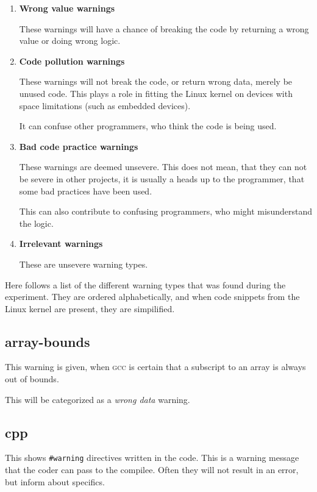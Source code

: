 \documentclass[a4paper,11pt]{report}
\newcommand{\textcode}[1]{\fboxsep=1pt\texttt{\colorbox{gray!20}{#1}}}
\newcommand{\figa}{
    \begin{figure}[!htpb]
    \centering
}
\newcommand{\figb}[2]{
    \caption{#1}
    \label{#2}
    \end{figure}
}
\begin{document}
\begin{enumerate}
    \item \textbf{Wrong value warnings}

These warnings will have a chance of breaking the code by returning a wrong
value or doing wrong logic.

    \item \textbf{Code pollution warnings}

These warnings will not break the code, or return wrong data, merely be 
unused code. This plays a role in fitting the Linux kernel on devices with 
space limitations (such as embedded devices).

It can confuse other programmers, who think the code is being used.

    \item \textbf{Bad code practice warnings}

These warnings are deemed unsevere. This does not mean, that they can not be 
severe in other projects, it is usually a heads up to the programmer, that some 
bad practices have been used.

This can also contribute to confusing programmers, who might misunderstand the 
logic.


    \item \textbf{Irrelevant warnings}

These are unsevere warning types.

\end{enumerate}


Here follows a list of the different warning types that was found during the 
experiment.  They are ordered alphabetically, and when code snippets from the 
Linux kernel are present, they are simpilified.


            \subsection*{array-bounds}
This warning is given, when \textsc{gcc} is certain that a subscript to an array is always 
out of bounds.

This will be categorized as a \emph{wrong data} warning.




            \subsection*{cpp}
This shows \textcode{\#warning} directives written in the code. This is a warning
message that the coder can pass to the compilee. Often they will not result in 
an error, but inform about specifics.
\end{document}
